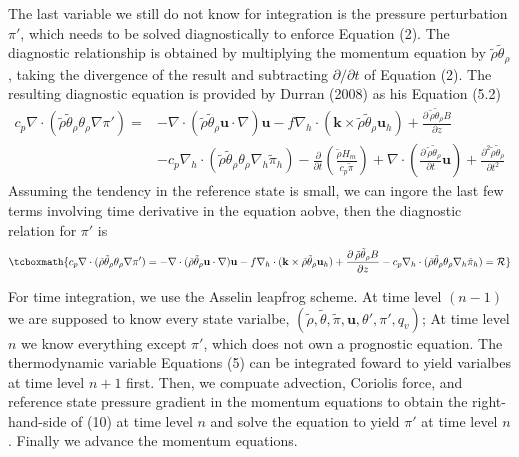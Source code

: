\documentclass[a4paper,11pt]{article}
\begin{document}
The last variable we still do not know for integration is the pressure perturbation $\pi'$, which needs to be solved diagnostically to enforce Equation (2). The diagnostic relationship is obtained by multiplying the momentum equation by $\tilde{\rho}\tilde{\theta}_{\rho}$, taking the divergence of the result and subtracting $\partial/\partial t$ of Equation (2). The resulting diagnostic equation is provided by Durran (2008) as his Equation (5.2)
\begin{equation}
 \begin{aligned}
  c_p\nabla\cdot(\tilde{\rho}\tilde{\theta}_{\rho}\theta_{\rho}\nabla\pi') =& -\nabla\cdot(\tilde{\rho}\tilde{\theta}_{\rho}\mathbf{u}\cdot\nabla)\mathbf{u} - f\nabla_h \cdot (\mathbf{k}\times \tilde{\rho}\tilde{\theta}_{\rho}\mathbf{u}_h) + \frac{\partial\,\tilde{\rho}\tilde{\theta}_{\rho}B}{\partial z}\\
  &  - c_p\nabla_h\cdot(\tilde{\rho}\tilde{\theta}_{\rho}\theta_{\rho} \nabla_h\tilde{\pi}_h)
  - \frac{\partial }{\partial t}\left(\frac{\tilde{\rho}H_m}{c_p\tilde{\pi}} \right) +
  \nabla\cdot\left(\frac{\partial\,\tilde{\rho}\tilde{\theta}_{\rho}}{\partial t}\mathbf{u}\right) +
   \frac{\partial^2 \tilde{\rho}\tilde{\theta}_{\rho}}{\partial t^2}  %
 \end{aligned}%
\end{equation}
Assuming the tendency in the reference state is small, we can ingore the last few terms involving time derivative in the equation aobve, then the diagnostic relation for $\pi'$ is
\begin{equation}
 \tcboxmath{
  c_p\nabla\cdot(\tilde{\rho}\tilde{\theta}_{\rho}\theta_{\rho}\nabla\pi') = -\nabla\cdot(\tilde{\rho}\tilde{\theta}_{\rho}\mathbf{u}\cdot\nabla)\mathbf{u} - f\nabla_h \cdot (\mathbf{k}\times \tilde{\rho}\tilde{\theta}_{\rho}\mathbf{u}_h) + \frac{\partial\,\tilde{\rho}\tilde{\theta}_{\rho}B}{\partial z}
   - c_p\nabla_h\cdot(\tilde{\rho}\tilde{\theta}_{\rho}\theta_{\rho} \nabla_h\tilde{\pi}_h) = \mathcal{R}}
\end{equation}


For time integration, we use the Asselin leapfrog scheme. At time level $(n-1)$ we are supposed to know every state varialbe, $(\tilde{\rho},\tilde{\theta},\tilde{\pi},\mathbf{u},\theta',\pi',q_v)$; At time level $n$ we know everything except $\pi'$, which does not own a prognostic equation. The thermodynamic variable Equations (5) can be integrated  foward to yield varialbes at time level $n+1$ first. Then, we compuate advection, Coriolis force, and reference state pressure gradient in the momentum equations to obtain the right-hand-side of (10) at time level $n$ and solve the equation to yield $\pi'$ at time level $n$. Finally we advance the momentum equations.
\end{document}
